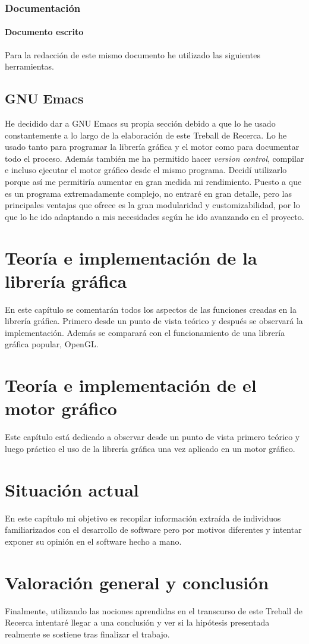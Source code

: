 \documentclass{report}
\begin{document}
\subsection{Documentación}
\subsubsection{Documento escrito}
Para la redacción de este mismo documento he utilizado las siguientes herramientas.
\section{GNU Emacs}
He decidido dar a GNU Emacs su propia sección debido a que lo he usado constantemente a lo largo de la elaboración de este Treball de Recerca. Lo he usado tanto para programar la librería gráfica y el motor como para documentar todo el proceso. Además también me ha permitido hacer \textit{version control}, compilar e incluso ejecutar el motor gráfico desde el mismo programa. Decidí utilizarlo porque así me permitiría aumentar en gran medida mi rendimiento. Puesto a que es un programa extremadamente complejo, no entraré en gran detalle, pero las principales ventajas que ofrece es la gran modularidad y customizabilidad, por lo que lo he ido adaptando a mis necesidades según he ido avanzando en el proyecto.

\newpage

\chapter{Teoría e implementación de la librería gráfica}
En este capítulo se comentarán todos los aspectos de las funciones creadas en la librería gráfica. Primero desde un punto de vista teórico y después se observará la implementación. Además se comparará con el funcionamiento de una librería gráfica popular, OpenGL.
\newpage
\chapter{Teoría e implementación de el motor gráfico}
Este capítulo está dedicado a observar desde un punto de vista primero teórico y luego práctico el uso de la librería gráfica una vez aplicado en un motor gráfico.
\newpage
\chapter{Situación actual}
En este capítulo mi objetivo es recopilar información extraída de individuos familiarizados con el desarrollo de software pero por motivos diferentes y intentar exponer su opinión en el software hecho a mano.
\newpage
\chapter{Valoración general y conclusión}
Finalmente, utilizando las nociones aprendidas en el transcurso de este Treball de Recerca intentaré llegar a una conclusión y ver si la hipótesis presentada realmente se sostiene tras finalizar el trabajo.
\end{document}
